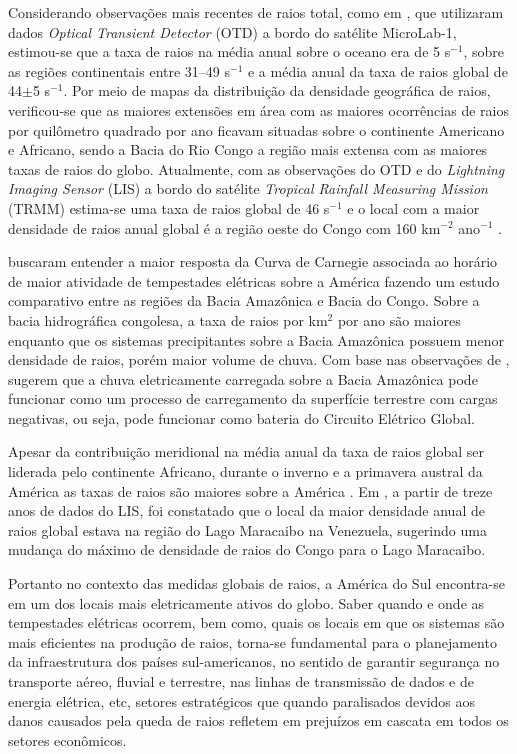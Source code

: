 Considerando observações mais recentes de raios total, como em \cite{christian2003global}, que utilizaram dados \textit{Optical Transient Detector} (OTD) a bordo do satélite MicroLab-1,  estimou-se que a taxa de raios na média anual sobre o oceano era de 5 s$^{-1}$, sobre as regiões continentais entre 31--49 s$^{-1}$ e a  média anual da taxa de raios global de 44$\pm$5 s$^{-1}$. Por meio de mapas da distribuição da densidade geográfica de raios, verificou-se que as maiores extensões em área com as maiores ocorrências de raios por quilômetro quadrado por ano ficavam situadas sobre o continente Americano e Africano, sendo a Bacia do Rio Congo a região mais extensa com as maiores taxas de raios do globo. Atualmente, com as observações do OTD e do \textit{Lightning Imaging Sensor} (LIS) a bordo do satélite \textit{Tropical Rainfall Measuring Mission} (TRMM) estima-se uma taxa de raios global de 46 s$^{-1}$ e o local com a maior densidade de raios anual global é a região oeste do Congo com 160   km$^{-2}$ ano$^{-1}$ \cite{cecil2014gridded}.

 buscaram entender a maior resposta da Curva de Carnegie associada ao horário de maior atividade de tempestades elétricas sobre a América fazendo um estudo comparativo entre as regiões da Bacia Amazônica e Bacia do Congo. Sobre a bacia hidrográfica congolesa, a taxa de raios por km$^2$ por ano são maiores enquanto que os sistemas precipitantes sobre a Bacia Amazônica possuem menor densidade de raios, porém maior volume de chuva. Com base nas observações de ,  sugerem que a chuva eletricamente carregada sobre a Bacia Amazônica pode funcionar como um processo de carregamento da superfície terrestre com cargas negativas, ou seja, pode funcionar como bateria do Circuito Elétrico Global.

Apesar da contribuição meridional na média anual da taxa de raios global ser liderada pelo continente Africano, durante o inverno e a primavera austral da América as taxas de raios são maiores sobre a América \cite{christian2003global}. Em , a partir de treze anos de dados do LIS, foi constatado que o local da maior densidade anual de raios global estava na região do Lago Maracaibo na Venezuela, sugerindo  uma mudança do máximo de densidade de raios do Congo para o Lago Maracaibo.

Portanto no contexto das medidas globais de raios, a América do Sul encontra-se em um dos locais mais eletricamente ativos do globo. Saber quando e onde as tempestades elétricas ocorrem, bem como, quais os locais em que os sistemas são mais eficientes na produção de raios, torna-se fundamental para o planejamento da infraestrutura dos países sul-americanos, no sentido de garantir segurança no transporte aéreo, fluvial e terrestre, nas linhas de transmissão de dados e de energia elétrica, etc, setores estratégicos que quando paralisados devidos aos danos causados pela queda de raios refletem em prejuízos em cascata em todos os setores econômicos. 


